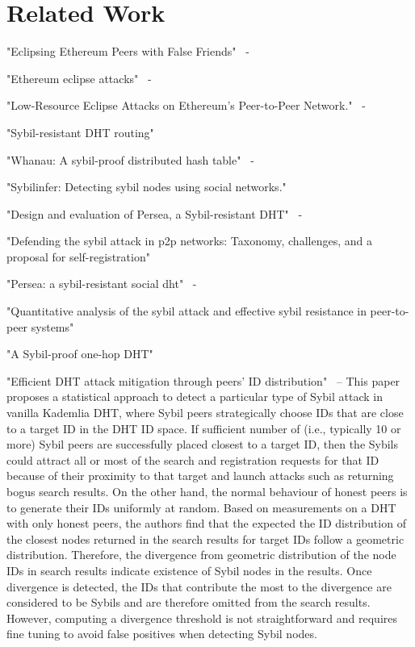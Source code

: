
\section{Related Work}

"Eclipsing Ethereum Peers with False Friends"~\cite{henningsen2019eclipsing} - 

"Ethereum eclipse attacks"~\cite{wust2016ethereum} - 

"Low-Resource Eclipse Attacks on Ethereum's Peer-to-Peer Network."~\cite{marcus2018low} - 

"Sybil-resistant DHT routing"~\cite{danezis2005sybil}

"Whanau: A sybil-proof distributed hash table"~\cite{lesniewski2010whanau} - 

"Sybilinfer: Detecting sybil nodes using social networks."~\cite{danezis2009sybilinfer}

"Design and evaluation of Persea, a Sybil-resistant DHT"~\cite{al2014design} - 

"Defending the sybil attack in p2p networks: Taxonomy, challenges, and a proposal for self-registration"~\cite{dinger2006defending}

"Persea: a sybil-resistant social dht"~\cite{al2013persea} - 

"Quantitative analysis of the sybil attack and effective sybil resistance in peer-to-peer systems"~\cite{jetter2010quantitative}

"A Sybil-proof one-hop DHT"~\cite{lesniewski2008sybil}

"Efficient DHT attack mitigation through peers' ID distribution"~\cite{cholez2010efficient} – This paper proposes a statistical approach to detect a particular type of Sybil attack in vanilla Kademlia DHT, where Sybil peers strategically choose IDs that are close to a target ID in the DHT ID space. If sufficient number of (i.e., typically 10 or more) Sybil peers are successfully placed closest to a target ID, then the Sybils could attract all or most of the search and registration requests for that ID because of their proximity to that target and launch attacks such as returning bogus search results. On the other hand, the normal behaviour of honest peers is to generate their IDs uniformly at random. Based on measurements on a DHT with only honest peers, the authors find that the expected the ID distribution of the closest nodes returned in the search results for target IDs follow a geometric distribution. Therefore, the divergence from geometric distribution of the node IDs in search results indicate existence of Sybil nodes in the results. Once divergence is detected, the IDs that contribute the most to the divergence are considered to be Sybils and are therefore omitted from the search results. However, computing a divergence threshold is not straightforward and requires fine tuning to avoid false positives when detecting Sybil nodes.

